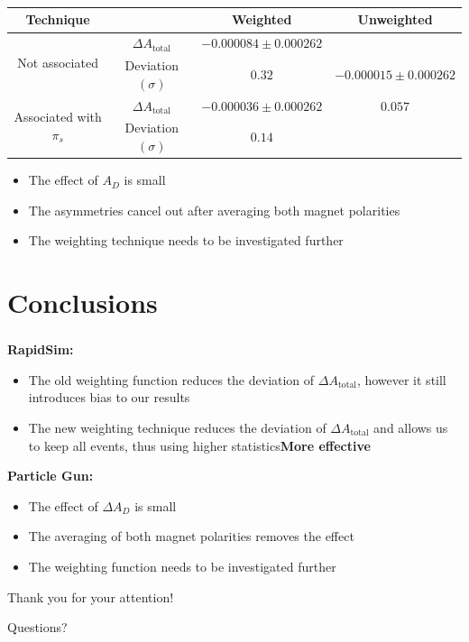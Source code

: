 \documentclass{beamer}
\begin{document}
\begin{frame}
      \frametitle{\insertsubsectionhead}
      \begin{center}
            \scriptsize
            \begin{tabular}{c|c|c|c}
                  Technique & & Weighted & Unweighted\\
                  \hline\hline
                  \multirow{2}{*}{Not associated} & $\Delta A_\text{total}$ & $-0.000084\pm 0.000262$& \\
                  & Deviation $(\sigma)$ & $0.32$& $-0.000015\pm 0.000262$\\
                  \cline{1-3}
                  \multirow{2}{*}{Associated with $\pi_s$} & $\Delta A_\text{total}$ & $-0.000036\pm 0.000262$& $0.057$\\
                  & Deviation $(\sigma)$ & $0.14$& \\
            \end{tabular}
      \end{center}
      \normalsize
      \begin{itemize}
            \item The effect of $A_D$ is small
            \item The asymmetries cancel out after averaging both magnet polarities
            \item The weighting technique needs to be investigated further
      \end{itemize}
\end{frame}

\section{Conclusions}
\begin{frame}
      \frametitle{\insertsectionhead}
      \textbf{RapidSim:}
      \begin{itemize}
            \item The old weighting function reduces the deviation of $\Delta A_\text{total}$, however it still introduces bias to our results
            \item The new weighting technique reduces the deviation of $\Delta A_\text{total}$ and allows us to keep all events, thus using higher statistics\Rightarrow \textbf{More effective}
      \end{itemize}
      \bigbreak
      \textbf{Particle Gun:}
      \begin{itemize}
            \item The effect of $\Delta A_D$ is small
            \item The averaging of both magnet polarities removes the effect
            \item The weighting function needs to be investigated further 
      \end{itemize}
\end{frame}


\begin{frame}
      \LARGE
      \centering
      Thank you for your attention!

      Questions?
\end{frame}
\end{document}

